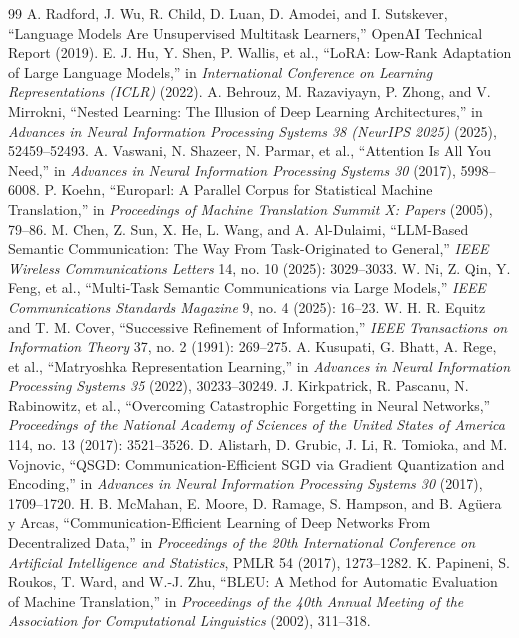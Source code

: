 \begin{thebibliography}{99}
 A. Radford, J. Wu, R. Child, D. Luan, D. Amodei, and I. Sutskever, ``Language Models Are Unsupervised Multitask Learners,'' OpenAI Technical Report (2019).
 E. J. Hu, Y. Shen, P. Wallis, et al., ``LoRA: Low-Rank Adaptation of Large Language Models,'' in \textit{International Conference on Learning Representations (ICLR)} (2022).
 A. Behrouz, M. Razaviyayn, P. Zhong, and V. Mirrokni, ``Nested Learning: The Illusion of Deep Learning Architectures,'' in \textit{Advances in Neural Information Processing Systems 38 (NeurIPS 2025)} (2025), 52459--52493.
 A. Vaswani, N. Shazeer, N. Parmar, et al., ``Attention Is All You Need,'' in \textit{Advances in Neural Information Processing Systems 30} (2017), 5998--6008.
 P. Koehn, ``Europarl: A Parallel Corpus for Statistical Machine Translation,'' in \textit{Proceedings of Machine Translation Summit X: Papers} (2005), 79--86.
 M. Chen, Z. Sun, X. He, L. Wang, and A. Al-Dulaimi, ``LLM-Based Semantic Communication: The Way From Task-Originated to General,'' \textit{IEEE Wireless Communications Letters} 14, no. 10 (2025): 3029--3033.
 W. Ni, Z. Qin, Y. Feng, et al., ``Multi-Task Semantic Communications via Large Models,'' \textit{IEEE Communications Standards Magazine} 9, no. 4 (2025): 16--23.
 W. H. R. Equitz and T. M. Cover, ``Successive Refinement of Information,'' \textit{IEEE Transactions on Information Theory} 37, no. 2 (1991): 269--275.
 A. Kusupati, G. Bhatt, A. Rege, et al., ``Matryoshka Representation Learning,'' in \textit{Advances in Neural Information Processing Systems 35} (2022), 30233--30249.
 J. Kirkpatrick, R. Pascanu, N. Rabinowitz, et al., ``Overcoming Catastrophic Forgetting in Neural Networks,'' \textit{Proceedings of the National Academy of Sciences of the United States of America} 114, no. 13 (2017): 3521--3526.
 D. Alistarh, D. Grubic, J. Li, R. Tomioka, and M. Vojnovic, ``QSGD: Communication-Efficient SGD via Gradient Quantization and Encoding,'' in \textit{Advances in Neural Information Processing Systems 30} (2017), 1709--1720.
 H. B. McMahan, E. Moore, D. Ramage, S. Hampson, and B. Ag\"uera y Arcas, ``Communication-Efficient Learning of Deep Networks From Decentralized Data,'' in \textit{Proceedings of the 20th International Conference on Artificial Intelligence and Statistics}, PMLR 54 (2017), 1273--1282.
 K. Papineni, S. Roukos, T. Ward, and W.-J. Zhu, ``BLEU: A Method for Automatic Evaluation of Machine Translation,'' in \textit{Proceedings of the 40th Annual Meeting of the Association for Computational Linguistics} (2002), 311--318.

\end{thebibliography}
